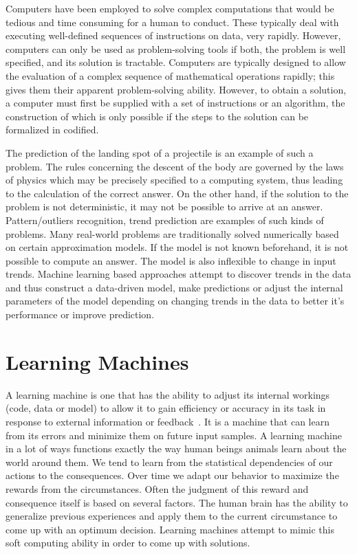 Computers have been employed to solve complex computations that would be tedious and time consuming for a human to conduct. These typically deal with executing well-defined sequences of instructions on data, very rapidly. However, computers can only be used as problem-solving tools if both, the problem is well specified, and its solution is tractable. Computers are typically designed to allow the evaluation of a complex sequence of mathematical operations rapidly; this gives them their apparent problem-solving ability. However, to obtain a solution, a computer must first be supplied with a set of instructions or an algorithm, the construction of which is only possible if the steps to the solution can be formalized in codified. 

The prediction of the landing spot of a projectile is an example of such a problem. The rules concerning the descent of the body are governed by the laws of physics which may be precisely specified to a computing system, thus leading to the calculation of the correct answer. On the other hand, if the solution to the problem is not deterministic, it may not be possible to arrive at an answer. Pattern/outliers recognition, trend prediction are examples of such kinds of problems. Many real-world problems are traditionally solved numerically based on certain approximation models. If the model is not known beforehand, it is not possible to compute an answer. The model is also inflexible to change in input trends. Machine learning based approaches attempt to discover trends in the data and thus construct a data-driven model, make predictions or adjust the internal parameters of the model depending on changing trends in the data to better it's performance or improve prediction.

\section{Learning Machines}
A learning machine is one that has the ability to adjust its internal workings (code, data or model) to allow it to gain efficiency or accuracy in its task in response to external information or feedback~\cite{mohri2012foundations}. It is a machine that can learn from its errors and minimize them on future input samples. A learning machine in a lot of ways functions exactly the way human beings animals learn about the world around them. We tend to learn from the statistical dependencies of our actions to the consequences. Over time we adapt our behavior to maximize the rewards from the circumstances. Often the judgment of this reward and consequence itself is based on several factors. The human brain has the ability to generalize previous experiences and apply them to the current circumstance to come up with an optimum decision. Learning machines attempt to mimic this soft computing ability in order to come up with solutions.


